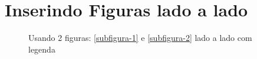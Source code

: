 \documentclass[a4paper, 12pt]{article}
\begin{document}
\section{Inserindo Figuras lado a lado}

\begin{figure}[!htb] %
	\centering %
	\label{FiguraTotal} %
	\hfill
	\caption{Usando 2 figuras: \ref{subfigura-1} e \ref{subfigura-2} lado a lado com legenda} %
\end{figure}
\end{document}

